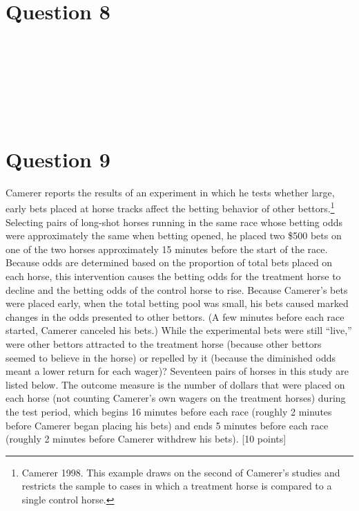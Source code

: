 \documentclass[11pt,notitlepage]{article}\usepackage[]{graphicx}\usepackage[]{color}
\makeatletter
\newenvironment{kframe}{%
 \def\at@end@of@kframe{}%
 \ifinner\ifhmode%
  \def\at@end@of@kframe{\end{minipage}}%
  \begin{minipage}{\columnwidth}%
 \fi\fi%
 \def\FrameCommand##1{\hskip\@totalleftmargin \hskip-\fboxsep
 \colorbox{shadecolor}{##1}\hskip-\fboxsep
     \hskip-\linewidth \hskip-\@totalleftmargin \hskip\columnwidth}%
 \MakeFramed {\advance\hsize-\width
   \@totalleftmargin\z@ \linewidth\hsize
   \@setminipage}}%
 {\par\unskip\endMakeFramed%
 \at@end@of@kframe}
\newenvironment{knitrout}{}{} %
\makeatother
\begin{document}
\section*{Question 8}

\begin{knitrout}
\color{fgcolor}\begin{kframe}
\begin{verbatim}








\end{verbatim}
\end{kframe}
\end{knitrout}


\section*{Question 9}

Camerer reports the results of an experiment in which he tests whether large, early bets placed at horse tracks affect the betting behavior of other bettors.\footnote{Camerer 1998.  This example draws on the second of Camerer's studies and restricts the sample to cases in which a treatment horse is compared to a single control horse.} Selecting pairs of long-shot horses running in the same race whose betting odds were approximately the same when betting opened, he placed two \$500 bets on one of the two horses approximately 15 minutes before the start of the race. Because odds are determined based on the proportion of total bets placed on each horse, this intervention causes the betting odds for the treatment horse to decline and the betting odds of the control horse to rise. Because Camerer's bets were placed early, when the total betting pool was small, his bets caused marked changes in the odds presented to other bettors. (A few minutes before each race started, Camerer canceled his bets.) While the experimental bets were still ``live,'' were other bettors attracted to the treatment horse (because other bettors seemed to believe in the horse) or repelled by it (because the diminished odds meant a lower return for each wager)? Seventeen pairs of horses in this study are listed below. The outcome measure is the number of dollars that were placed on each horse (not counting Camerer's own wagers on the treatment horses) during the test period, which begins 16 minutes before each race (roughly 2 minutes before Camerer began placing his bets) and ends 5 minutes before each race (roughly 2 minutes before Camerer withdrew his bets). [10 points]
\end{document}
